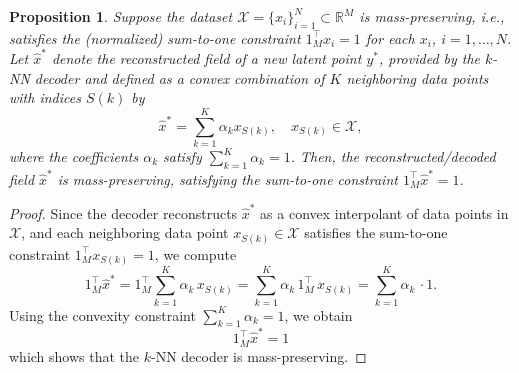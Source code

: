 \documentclass{article}
\newtheorem{prop}{Proposition}
\begin{document}
\begin{prop} \label{prop:kNN_cons}
Suppose the dataset $\mathcal{X}=\{x_i\}_{i=1}^N\subset\mathbb{R}^M$ is mass-preserving, i.e., satisfies the (normalized) sum-to-one constraint $1_M^\top x_i = 1$ for each $x_i$, $i=1,\ldots,N$. Let $\hat{x}^*$ denote the reconstructed field of a new latent point $y^*$, provided by the $k$-NN decoder and defined as a convex combination of $K$ neighboring data points with indices $S(k)$ by
\begin{equation*}
    \hat{x}^*= \sum_{k=1}^K \alpha_k x_{S(k)}, \quad x_{S(k)}\in \mathcal{X},
\end{equation*}
where the coefficients $\alpha_k$ satisfy $\sum_{k=1}^K \alpha_k =1$. Then, the reconstructed/decoded field $\hat{x}^*$ is mass-preserving, satisfying the sum-to-one constraint $1_M^\top \hat{x}^* = 1$.
\end{prop}
\begin{proof}
Since the decoder reconstructs $\hat{x}^*$ as a convex interpolant of data points in $\mathcal{X}$, and each neighboring data point $x_{S(k)}\in\mathcal{X}$ satisfies the sum-to-one constraint $1_M^\top x_{S(k)} = 1$, we compute
\begin{equation}
    1^{\top}_M \hat{x}^*=1_M^\top \sum_{k=1}^{K}\alpha_k \, x_{S(k)}=\sum_{k=1}^{K}\alpha_k \, 1_M^\top \, x_{S(k)}=\sum_{k=1}^{K}\alpha_k\, \cdot 1.
\end{equation}
Using the convexity constraint $\sum_{k=1}^K \alpha_k =1$, we obtain 
\begin{equation*}
    1_M^\top \hat{x}^* = 1
\end{equation*}
which shows that the $k$-NN decoder is mass-preserving.
\end{proof}
\end{document}
